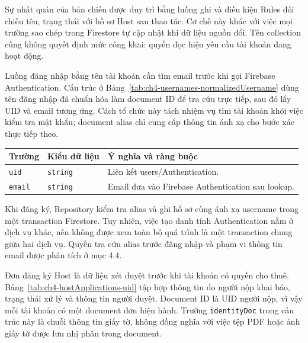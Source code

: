 Sự nhất quán của bản chiếu được duy trì bằng luồng ghi và điều kiện Rules đối chiếu tên, trạng thái với hồ sơ Host sau thao tác. Cơ chế này khác với việc mọi trường sao chép trong Firestore tự cập nhật khi dữ liệu nguồn đổi. Tên collection cũng không quyết định mức công khai: quyền đọc hiện yêu cầu tài khoản đang hoạt động.

Luồng đăng nhập bằng tên tài khoản cần tìm email trước khi gọi Firebase Authentication. Cấu trúc ở Bảng~\ref{tab:ch4-usernames-normalizedUsername} dùng tên đăng nhập đã chuẩn hóa làm document ID để tra cứu trực tiếp, sau đó lấy UID và email tương ứng. Cách tổ chức này tách nhiệm vụ tìm tài khoản khỏi việc kiểm tra mật khẩu; document alias chỉ cung cấp thông tin ánh xạ cho bước xác thực tiếp theo.

\par\medskip\noindent\begin{minipage}{\linewidth}\small{}
\label{tab:ch4-usernames-normalizedUsername}
\begin{tabular}{@{}>{\raggedright\arraybackslash}p{4.35cm}>{\raggedright\arraybackslash}p{2.75cm}>{\raggedright\arraybackslash}p{8.15cm}@{}}
\toprule Trường & Kiểu dữ liệu & Ý nghĩa và ràng buộc \\ \midrule
\texttt{uid} & \texttt{string} & Liên kết users/Authentication. \\*
\texttt{email} & \texttt{string} & Email đưa vào Firebase Authentication sau lookup. \\
\bottomrule\end{tabular}\end{minipage}\par\medskip

Khi đăng ký, Repository kiểm tra alias và ghi hồ sơ cùng ánh xạ username trong một transaction Firestore. Tuy nhiên, việc tạo danh tính Authentication nằm ở dịch vụ khác, nên không được xem toàn bộ quá trình là một transaction chung giữa hai dịch vụ. Quyền tra cứu alias trước đăng nhập và phạm vi thông tin email được phân tích ở mục 4.4.

Đơn đăng ký Host là dữ liệu xét duyệt trước khi tài khoản có quyền cho thuê. Bảng~\ref{tab:ch4-hostApplications-uid} tập hợp thông tin do người nộp khai báo, trạng thái xử lý và thông tin người duyệt. Document ID là UID người nộp, vì vậy mỗi tài khoản có một document đơn hiện hành. Trường \texttt{identity\allowbreak{}Doc} trong cấu trúc này là chuỗi thông tin giấy tờ, không đồng nghĩa với việc tệp PDF hoặc ảnh giấy tờ được lưu nhị phân trong document.

